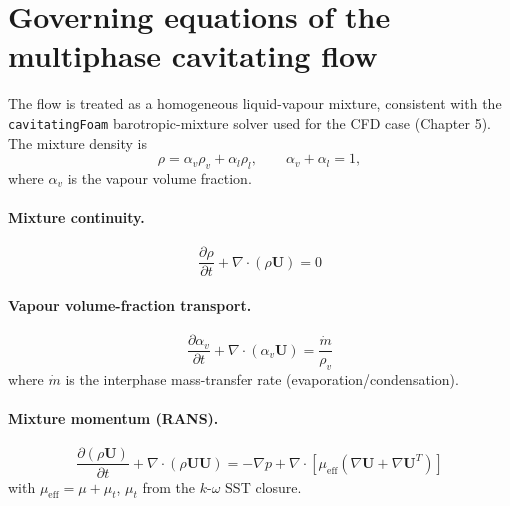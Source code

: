 
\section{Governing equations of the multiphase cavitating flow}

The flow is treated as a homogeneous liquid-vapour mixture, consistent with the
\texttt{cavitatingFoam} barotropic-mixture solver used for the CFD case
(Chapter 5). The mixture density is
\begin{equation}
    \rho = \alpha_v \rho_v + \alpha_l \rho_l, \qquad \alpha_v + \alpha_l = 1,
\end{equation}
where $\alpha_v$ is the vapour volume fraction.

\paragraph{Mixture continuity.}
\begin{equation}
    \frac{\partial \rho}{\partial t} + \nabla\!\cdot(\rho \mathbf{U}) = 0
\end{equation}

\paragraph{Vapour volume-fraction transport.}
\begin{equation}
    \frac{\partial \alpha_v}{\partial t} + \nabla\!\cdot(\alpha_v \mathbf{U}) = \frac{\dot m}{\rho_v}
\end{equation}
where $\dot m$ is the interphase mass-transfer rate (evaporation/condensation).

\paragraph{Mixture momentum (RANS).}
\begin{equation}
    \frac{\partial (\rho \mathbf{U})}{\partial t} + \nabla\!\cdot(\rho \mathbf{U}\mathbf{U})
    = -\nabla p + \nabla\!\cdot\!\left[\mu_{\text{eff}}\left(\nabla \mathbf{U} + \nabla \mathbf{U}^T\right)\right]
\end{equation}
with $\mu_{\text{eff}} = \mu + \mu_t$, $\mu_t$ from the $k$-$\omega$ SST closure.


